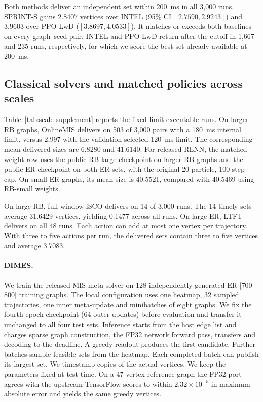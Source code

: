 Both methods deliver an independent set within 200~ms in all 3,000 runs. SPRINT-S gains \(2.8407\) vertices over INTEL (95\% CI \([2.7590,2.9243]\)) and \(3.9603\) over PPO-LwD (\([3.8697,4.0533]\)). It matches or exceeds both baselines on every graph--seed pair. INTEL and PPO-LwD return after the cutoff in 1,667 and 235 runs, respectively, for which we score the best set already available at 200~ms.

\subsection{Classical solvers and matched policies across scales}
\label{app:scale-supplement}

Table~\ref{tab:scale-supplement} reports the fixed-limit executable runs. On larger RB graphs, OnlineMIS delivers on 503 of 3,000 pairs with a 180~ms internal limit, versus 2,997 with the validation-selected 120~ms limit. The corresponding mean delivered sizes are 6.8280 and 41.6140. For released RLNN, the matched-weight row uses the public RB-large checkpoint on larger RB graphs and the public ER checkpoint on both ER sets, with the original 20-particle, 100-step cap. On small ER graphs, its mean size is 40.5521, compared with 40.5469 using RB-small weights.

On large RB, full-window iSCO delivers on 14 of 3,000 runs. The 14 timely sets average 31.6429 vertices, yielding 0.1477 across all runs. On large ER, LTFT delivers on all 48 runs. Each action can add at most one vertex per trajectory. With three to five actions per run, the delivered sets contain three to five vertices and average 3.7083.

\paragraph{DIMES.} We train the released MIS meta-solver \citep{qiu2022dimes} on 128 independently generated ER-[700--800] training graphs. The local configuration uses one heatmap, 32 sampled trajectories, one inner meta-update and minibatches of eight graphs. We fix the fourth-epoch checkpoint (64 outer updates) before evaluation and transfer it unchanged to all four test sets. Inference starts from the host edge list and charges sparse graph construction, the FP32 network forward pass, transfers and decoding to the deadline. A greedy readout produces the first candidate. Further batches sample feasible sets from the heatmap. Each completed batch can publish its largest set. We timestamp copies of the actual vertices. We keep the parameters fixed at test time. On a 47-vertex reference graph the FP32 port agrees with the upstream TensorFlow scores to within $2.32\times 10^{-5}$ in maximum absolute error and yields the same greedy vertices.

